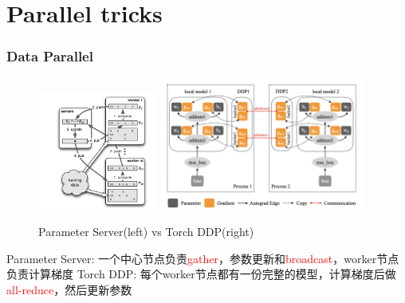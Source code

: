 \documentclass{beamer}
\begin{document}

\section{Parallel tricks}

\begin{frame}[fragile]
\frametitle{Data Parallel}
\begin{figure}[h]
    \centering
    \includegraphics[width=0.35\textwidth]{parameter_server.png}
    \hfill
    \includegraphics[width=0.6\textwidth,height=0.5\textheight]{torch_ddp.png}
    \captionsetup{labelformat=empty}
    \caption{Parameter Server(left) vs Torch DDP(right)}
\end{figure}

Parameter Server: 一个中心节点负责\textcolor{red}{gather}，参数更新和\textcolor{red}{broadcast}，worker节点负责计算梯度\newline
Torch DDP: 每个worker节点都有一份完整的模型，计算梯度后做\textcolor{red}{all-reduce}，然后更新参数

\end{frame}
\end{document}
